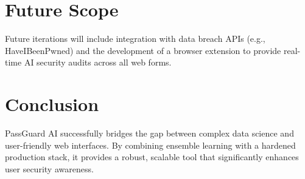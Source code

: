 \documentclass[12pt,a4paper]{article}
\begin{document}
\section{Future Scope}
Future iterations will include integration with data breach APIs (e.g., HaveIBeenPwned) and the development of a browser extension to provide real-time AI security audits across all web forms.

\section{Conclusion}
PassGuard AI successfully bridges the gap between complex data science and user-friendly web interfaces. By combining ensemble learning with a hardened production stack, it provides a robust, scalable tool that significantly enhances user security awareness.
\end{document}
